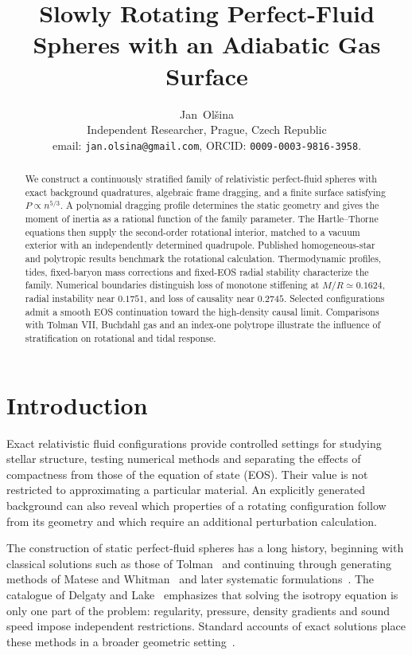 \documentclass[journal,a4paper]{IEEEtran}
\date{}
\begin{document}
\title{Slowly Rotating Perfect-Fluid Spheres with an Adiabatic Gas Surface}
\author{Jan~Ol\v{s}ina\\[1ex] Independent Researcher, Prague, Czech Republic\\
email: \texttt{jan.olsina@gmail.com}, ORCID: \texttt{0009-0003-9816-3958}.}
\maketitle

\begin{abstract}
We construct a continuously stratified family of relativistic perfect-fluid spheres with exact background quadratures, algebraic frame dragging, and a finite surface satisfying $P\propto n^{5/3}$. A polynomial dragging profile determines the static geometry and gives the moment of inertia as a rational function of the family parameter. The Hartle--Thorne equations then supply the second-order rotational interior, matched to a vacuum exterior with an independently determined quadrupole. Published homogeneous-star and polytropic results benchmark the rotational calculation. Thermodynamic profiles, tides, fixed-baryon mass corrections and fixed-EOS radial stability characterize the family. Numerical boundaries distinguish loss of monotone stiffening at $M/R\simeq0.1624$, radial instability near $0.1751$, and loss of causality near $0.2745$. Selected configurations admit a smooth EOS continuation toward the high-density causal limit. Comparisons with Tolman VII, Buchdahl gas and an index-one polytrope illustrate the influence of stratification on rotational and tidal response.
\end{abstract}

\section{Introduction}
Exact relativistic fluid configurations provide controlled settings for studying stellar structure, testing numerical methods and separating the effects of compactness from those of the equation of state (EOS). Their value is not restricted to approximating a particular material. An explicitly generated background can also reveal which properties of a rotating configuration follow from its geometry and which require an additional perturbation calculation.

The construction of static perfect-fluid spheres has a long history, beginning with classical solutions such as those of Tolman~\cite{tolman} and continuing through generating methods of Matese and Whitman~\cite{matesewhitman} and later systematic formulations~\cite{lake,martin,rahman,boonserm}. The catalogue of Delgaty and Lake~\cite{delgaty} emphasizes that solving the isotropy equation is only one part of the problem: regularity, pressure, density gradients and sound speed impose independent restrictions. Standard accounts of exact solutions place these methods in a broader geometric setting~\cite{stephani}.
\end{document}
